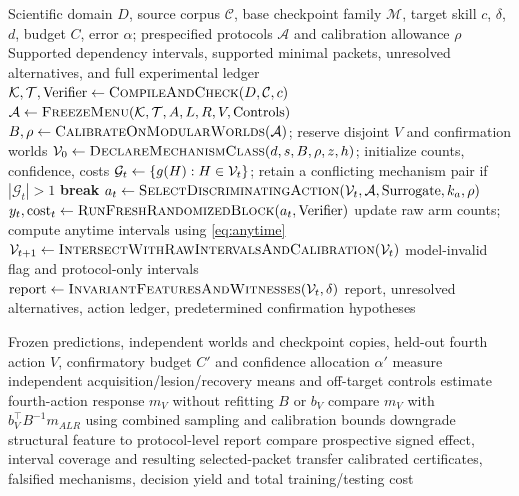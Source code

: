 \documentclass[11pt,a4paper]{article}
\newcommand{\A}{\mathcal{A}}\newcommand{\M}{\mathcal{M}}
\theoremstyle{definition}\newtheorem{definition}[theorem]{Definition}
\theoremstyle{remark}\newtheorem{remark}[theorem]{Remark}
\begin{document}
\begin{algorithm}[htbp]
\caption{\textsc{RECON-$\Omega$-Discover}: adaptive competence identification}\label{alg:discover}
\begin{algorithmic}[1]
\Require Scientific domain $D$, source corpus $\mathcal C$, base checkpoint family $\mathcal M$, target skill $c$, $\delta$, $d$, budget $C$, error $\alpha$; prespecified protocols $\A$ and calibration allowance $\rho$
\Ensure Supported dependency intervals, supported minimal packets, unresolved alternatives, and full experimental ledger
\State $\mathcal K,\mathcal T,\mathrm{Verifier}\gets\textsc{CompileAndCheck}(D,\mathcal C,c)$
\State $\A\gets\textsc{FreezeMenu}(\mathcal K,\mathcal T,A,L,R,V,\mathrm{Controls})$
\State $B,\rho\gets\textsc{CalibrateOnModularWorlds}(\A)$; reserve disjoint $V$ and confirmation worlds
\State $\mathcal{V}_0\gets\textsc{DeclareMechanismClass}(d,s,B,\rho,z,h)$; initialize counts, confidence, costs
  \State $\mathcal G_t\gets\{g(H):H\in\mathcal{V}_t\}$; retain a conflicting mechanism pair if $|\mathcal G_t|>1$
  \State \textbf{break}\EndIf
  \State $a_t\gets\textsc{SelectDiscriminatingAction}(\V_t,\A,\mathrm{Surrogate},k_a,\rho)$
  \State $y_t,\mathrm{cost}_t\gets\textsc{RunFreshRandomizedBlock}(a_t,\mathrm{Verifier})$
  \State update raw arm counts; compute anytime intervals using \cref{eq:anytime}
  \State $\mathcal{V}_{t+1}\gets\textsc{IntersectWithRawIntervalsAndCalibration}(\mathcal{V}_t)$
  \State \Return model-invalid flag and protocol-only intervals\EndIf
\EndWhile
\State $\mathrm{report}\gets\textsc{InvariantFeaturesAndWitnesses}(\mathcal{V}_t,\delta)$
\State \Return report, unresolved alternatives, action ledger, predetermined confirmation hypotheses
\end{algorithmic}
\end{algorithm}

\begin{algorithm}[htbp]
\caption{\textsc{Confirm}: independent validation and overidentification}\label{alg:confirm}
\begin{algorithmic}[1]
\Require Frozen predictions, independent worlds and checkpoint copies, held-out fourth action $V$, confirmatory budget $C'$ and confidence allocation $\alpha'$
 \State measure independent acquisition/lesion/recovery means and off-target controls
 \State estimate fourth-action response $m_V$ without refitting $B$ or $b_V$
 \State compare $m_V$ with $b_V^\top B^{-1}m_{ALR}$ using combined sampling and calibration bounds
 \State downgrade structural feature to protocol-level report\EndIf
 \State compare prospective signed effect, interval coverage and resulting selected-packet transfer
\EndFor
\State \Return calibrated certificates, falsified mechanisms, decision yield and total training/testing cost
\end{algorithmic}
\end{algorithm}
\end{document}
